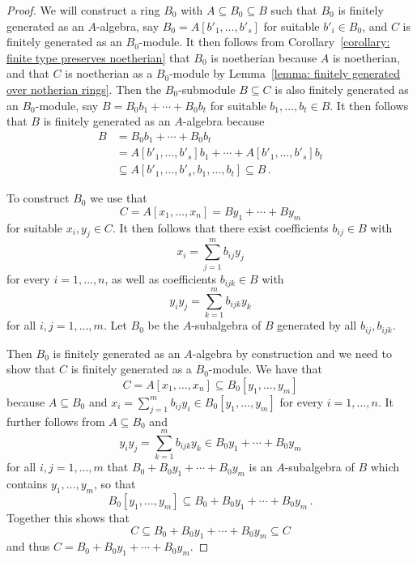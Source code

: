 \begin{proof}
  We will construct a ring $B_0$ with $A \subseteq B_0 \subseteq B$ such that $B_0$ is finitely generated as an $A$-algebra, say $B_0 = A[b'_1, \dotsc, b'_s]$ for suitable $b'_i \in B_0$, and $C$ is finitely generated as an $B_0$-module.
  It then follows from Corollary~\ref{corollary: finite type preserves noetherian} that $B_0$ is noetherian because $A$ is noetherian, and that $C$ is noetherian as a $B_0$-module by Lemma~\ref{lemma: finitely generated over notherian rings}.
  Then the $B_0$-submodule $B \subseteq C$ is also finitely generated as an $B_0$-module, say $B = B_0 b_1 + \dotsb + B_0 b_t$ for suitable $b_1, \dotsc, b_t \in B$.
  It then follows that $B$ is finitely generated as an $A$-algebra because
  \begin{align*}
                B
    &=          B_0 b_1 + \dotsb + B_0 b_t  \\
    &=          A[b'_1, \dotsc, b'_s] b_1 + \dotsb + A[b'_1, \dotsc, b'_s] b_t  \\
    &\subseteq  A[b'_1, \dotsc, b'_s, b_1, \dotsc, b_t]
     \subseteq  B \,.
  \end{align*}
  
  To construct $B_0$ we use that
  \[
      C
    = A[x_1, \dotsc, x_n]
    = B y_1 + \dotsb + B y_m
  \]
  for suitable $x_i, y_j \in C$.
  It then follows that there exist coefficients $b_{ij} \in B$ with
  \[
      x_i
    = \sum_{j=1}^m b_{ij} y_j
  \]
  for every $i = 1, \dotsc, n$, as well as coefficients $b_{ijk} \in B$ with
  \[
      y_i y_j
    = \sum_{k=1}^m b_{ijk} y_k
  \]
  for all $i,j = 1, \dotsc, m$.
  Let $B_0$ be the $A$-subalgebra of $B$ generated by all $b_{ij}, b_{ijk}$.
  
  Then $B_0$ is finitely generated as an $A$-algebra by construction and we need to show that $C$ is finitely generated as a $B_0$-module.
  We have that
  \[
              C
    =         A[x_1, \dotsc, x_n]
    \subseteq B_0[y_1, \dotsc, y_m]
  \]
  because $A \subseteq B_0$ and $x_i = \sum_{j=1}^m b_{ij} y_i \in B_0[y_1, \dotsc, y_m]$ for every $i = 1, \dotsc, n$.
  It further follows from $A \subseteq B_0$ and
  \[
        y_i y_j
    =   \sum_{k=1}^m b_{ijk} y_k
    \in B_0 y_1 + \dotsb + B_0 y_m
  \]
  for all $i, j = 1, \dotsc, m$ that $B_0 + B_0 y_1 + \dotsb + B_0 y_m$ is an $A$-subalgebra of $B$ which contains $y_1, \dotsc, y_m$, so that
  \[
              B_0[y_1, \dotsc, y_m]
    \subseteq B_0 + B_0 y_1 + \dotsb + B_0 y_m \,.
  \]
  Together this shows that
  \[
              C
    \subseteq B_0 + B_0 y_1 + \dotsb + B_0 y_m
    \subseteq C
  \]
  and thus $C = B_0 + B_0 y_1 + \dotsb + B_0 y_m$.
\end{proof}


